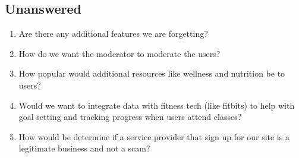 \documentclass[12pt]{article}
\begin{document}
\subsection{Unanswered}
\begin{enumerate}
\item Are there any additional features we are forgetting?
\item How do we want the moderator to moderate the users? 
\item How popular would additional resources like wellness and nutrition be to users? 
\item Would we want to integrate data with fitness tech (like fitbits) to help with goal setting and tracking progress when users attend classes?
\item How would be determine if a service provider that sign up for our site is a legitimate business and not a scam?
\end{enumerate}
\end{document}

